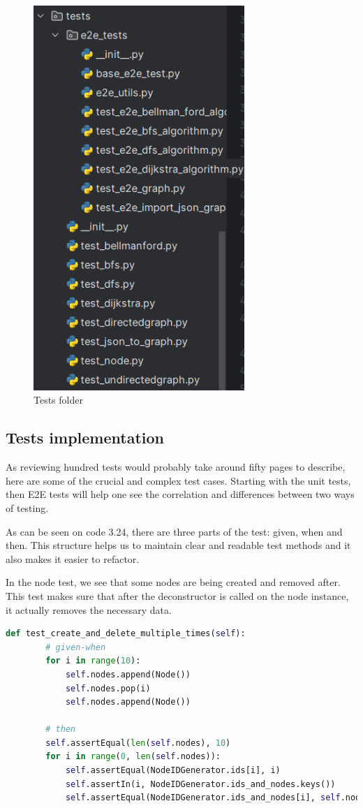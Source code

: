 \begin{figure}[H]
	\centering
	\includegraphics[width=80mm]{images/tests_folder.png}
	\caption{Tests folder}
\end{figure}

\subsection{Tests implementation}

As reviewing hundred tests would probably take around fifty pages to describe, here are some of the crucial and complex test cases. Starting with the unit tests, then E2E tests will help one see the correlation and differences between two ways of testing.

As can be seen on code 3.24, there are three parts of the test: given, when and then. This structure helps us to maintain clear and readable test methods and it also makes it easier to refactor.

In the node test, we see that some nodes are being created and removed after. This test makes sure that after the deconstructor is called on the node instance, it actually removes the necessary data.

\begin{lstlisting}[language={python}]
	def test_create_and_delete_multiple_times(self):
		# given-when
		for i in range(10):
			self.nodes.append(Node())
			self.nodes.pop(i)
			self.nodes.append(Node())
		
		# then
		self.assertEqual(len(self.nodes), 10)
		for i in range(0, len(self.nodes)):
			self.assertEqual(NodeIDGenerator.ids[i], i)
			self.assertIn(i, NodeIDGenerator.ids_and_nodes.keys())
			self.assertEqual(NodeIDGenerator.ids_and_nodes[i], self.nodes[i].__hash__())
\end{lstlisting}
    
